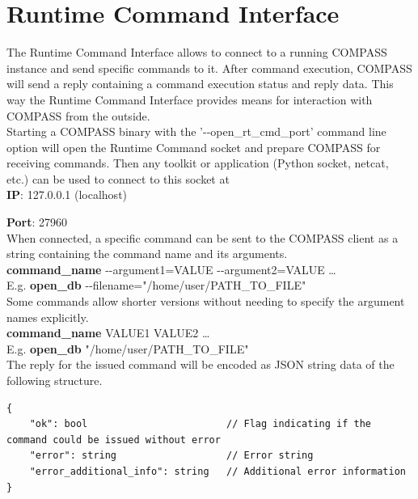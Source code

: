 \section{Runtime Command Interface}
\label{sec:rtcommand_interface}

The Runtime Command Interface allows to connect to a running COMPASS instance and send 
specific commands to it. After command execution, COMPASS will send a reply
containing a command execution status and reply data. This way 
the Runtime Command Interface provides means for interaction with COMPASS from the outside. \\

Starting a COMPASS binary with the '-{}-open\_rt\_cmd\_port' command line option will open the Runtime Command socket
and prepare COMPASS for receiving commands. Then any toolkit or application (Python socket, netcat, etc.)
can be used to connect to this socket at \\

\textbf{IP}: 127.0.0.1 (localhost)

\textbf{Port}: 27960 \\

When connected, a specific command can be sent to the COMPASS client as a string containing the command name and its arguments. \\

\textbf{command\_name} -{}-argument1=VALUE -{}-argument2=VALUE \dots \\

E.g. \textbf{open\_db} -{}-filename="/home/user/PATH\_TO\_FILE" \\

Some commands allow shorter versions without needing to specify the argument names explicitly. \\

\textbf{command\_name} VALUE1 VALUE2 \dots \\

E.g. \textbf{open\_db} "/home/user/PATH\_TO\_FILE" \\

The reply for the issued command will be encoded as JSON string data of the following structure.

\begin{lstlisting}[basicstyle=\small\ttfamily]
{
    "ok": bool                        // Flag indicating if the command could be issued without error 
    "error": string                   // Error string
    "error_additional_info": string   // Additional error information
}
\end{lstlisting}

